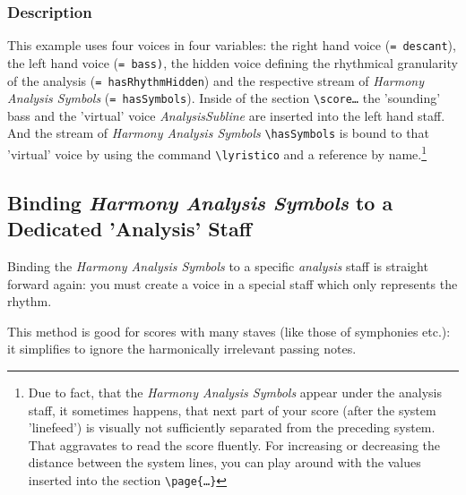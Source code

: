 \documentclass[
  DIV=calc,
  BCOR=5mm,
  12pt,
  headings=small,
  oneside,
  abstract=true,
  toc=bib,
  xcolor=dvipsnames,
  openany,
  ngerman,english]{scrartcl}
\newcommand{\acc}[0]{\textit}
\newcommand{\has}[1]{\textit{Harmony Analysis Symbol#1}}
\begin{document}
\subsubsection{Description}

This example uses four voices in four variables: the right hand voice
(\texttt{= descant}), the left hand voice (\texttt{= bass)}, the hidden voice
defining the rhythmical granularity of the analysis (\texttt{= hasRhythmHidden})
and the respective stream of \has{s} (\texttt{= hasSymbols}). Inside of the
section \texttt{\textbackslash score{\ldots}} the 'sounding' bass and the
'virtual' voice \acc{AnalysisSubline} are inserted into the left hand staff. And
the stream of \has{s} \texttt{\textbackslash hasSymbols} is bound to that
'virtual' voice by using the command \texttt{\textbackslash lyristico} and a
reference by name.\footnote{Due to fact, that the \has{s} appear under the
analysis staff, it sometimes happens, that next part of your score (after the
system 'linefeed') is visually not sufficiently separated from the preceding
system. That aggravates to read the score fluently. For increasing or decreasing
the distance between the system lines, you can play around with the values
inserted into the section \texttt{\textbackslash page\{\ldots\}}}


\subsection{Binding \has{s} to a Dedicated 'Analysis' Staff}
\label{BindingToDedicatedAnalysisStaff}

Binding the \has{s} to a specific \acc{analysis} staff is straight forward
again: you must create a voice in a special staff which only represents the
rhythm. 

This method is good for scores with many staves (like those of symphonies etc.):
it simplifies to ignore the harmonically irrelevant passing notes.
\end{document}
